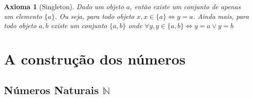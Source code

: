 \documentclass{article}
\newcommand{\NN}{\mathbb{N}}
\theoremstyle{plain}
\newtheorem{axm}{Axioma}
\theoremstyle{remark}
\numberwithin{equation}{section}
\numberwithin{thm}{section}
\numberwithin{defn}{section}
\numberwithin{lemma}{section}
\numberwithin{axm}{section}
\begin{document}
\begin{axm}[Singleton]\label{axm1:3}
Dado um objeto \(a\), então existe um conjunto  de apenas um elemento \(\{a\}\). Ou seja, para todo objeto \(x, x \in \{a\} \iff y = a\). Ainda mais, para todo objeto \(a, b\) existe um conjunto \(\{a,b\}\) onde \(\forall y, y \in \{a,b\} \iff y = a \vee y = b\) 

\end{axm}

\section{A construção dos números}
\subsection{Números Naturais \(\NN\)}
\end{document}

